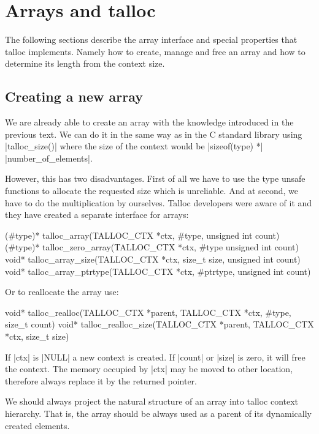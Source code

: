 \section{Arrays and talloc}
\label{talloc:sec:arrays}

The following sections describe the array interface and special properties that
talloc implements. Namely how to create, manage and free an array and how to
determine its length from the context size.

\subsection{Creating a new array}

We are already able to create an array with the knowledge introduced in the
previous text. We can do it in the same way as in the C standard library using
|talloc_size()| where the size of the context would be |sizeof(type) *|
|number_of_elements|.

However, this has two disadvantages. First of all we have to use the type unsafe
functions to allocate the requested size which is unreliable. And at second,
we have to do the multiplication by ourselves. Talloc developers were aware of
it and they have created a separate interface for arrays:

\begin{funcproto}
(#type)* talloc_array(TALLOC_CTX *ctx, #type,
                      unsigned int count)
(#type)* talloc_zero_array(TALLOC_CTX *ctx, #type
                           unsigned int count)
void* talloc_array_size(TALLOC_CTX *ctx, size_t size,
                        unsigned int count)
void* talloc_array_ptrtype(TALLOC_CTX *ctx, #ptrtype,
                           unsigned int count)
\end{funcproto}
\funclistend
Or to reallocate the array use:

\begin{funcproto}
void* talloc_realloc(TALLOC_CTX *parent,
                     TALLOC_CTX *ctx,
                     #type, size_t count)
void* talloc_realloc_size(TALLOC_CTX *parent,
                          TALLOC_CTX *ctx,
                          size_t size)
\end{funcproto}
\begin{funcdesc}
If |ctx| is |NULL| a new context is created. If |count| or |size| is zero, it
will free the context. The memory occupied by |ctx| may be moved to other
location, therefore always replace it by the returned pointer.
\end{funcdesc}
\funclistend
We should always project the natural structure of an array into talloc context
hierarchy. That is, the array should be always used as a parent of its
dynamically created elements.

